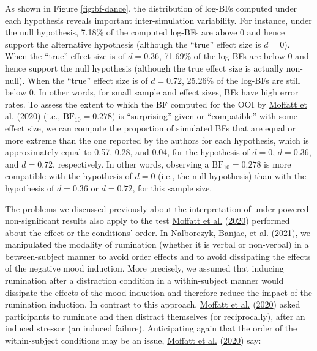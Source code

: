 \documentclass[
  english,
  man, donotrepeattitle,floatsintext]{apa6}
\begin{document}
As shown in Figure \ref{fig:bf-dance}, the distribution of log-BFs computed under each hypothesis reveals important inter-simulation variability. For instance, under the null hypothesis, 7.18\% of the computed log-BFs are above 0 and hence support the alternative hypothesis (although the ``true'' effect size is \(d = 0\)). When the ``true'' effect size is of \(d = 0.36\), 71.69\% of the log-BFs are below 0 and hence support the null hypothesis (although the true effect size is actually non-null). When the ``true'' effect size is of \(d = 0.72\), 25.26\% of the log-BFs are still below 0. In other words, for small sample and effect sizes, BFs have high error rates. To assess the extent to which the BF computed for the OOI by \protect\hyperlink{ref-moffatt_inner_2020}{Moffatt et al.} (\protect\hyperlink{ref-moffatt_inner_2020}{2020}) (i.e., \(\text{BF}_{10} = 0.278\)) is ``surprising'' given or ``compatible'' with some effect size, we can compute the proportion of simulated BFs that are equal or more extreme than the one reported by the authors for each hypothesis, which is approximately equal to 0.57, 0.28, and 0.04, for the hypothesis of \(d = 0\), \(d = 0.36\), and \(d = 0.72\), respectively. In other words, observing a \(\text{BF}_{10} = 0.278\) is more compatible with the hypothesis of \(d = 0\) (i.e., the null hypothesis) than with the hypothesis of \(d = 0.36\) or \(d = 0.72\), for this sample size.

The problems we discussed previously about the interpretation of under-powered non-significant results also apply to the test \protect\hyperlink{ref-moffatt_inner_2020}{Moffatt et al.} (\protect\hyperlink{ref-moffatt_inner_2020}{2020}) performed about the effect or the conditions' order. In \protect\hyperlink{ref-nalborczyk_dissociating_2021}{Nalborczyk, Banjac, et al.} (\protect\hyperlink{ref-nalborczyk_dissociating_2021}{2021}), we manipulated the modality of rumination (whether it is verbal or non-verbal) in a between-subject manner to avoid order effects and to avoid dissipating the effects of the negative mood induction. More precisely, we assumed that inducing rumination after a distraction condition in a within-subject manner would dissipate the effects of the mood induction and therefore reduce the impact of the rumination induction. In contrast to this approach, \protect\hyperlink{ref-moffatt_inner_2020}{Moffatt et al.} (\protect\hyperlink{ref-moffatt_inner_2020}{2020}) asked participants to ruminate and then distract themselves (or reciprocally), after an induced stressor (an induced failure). Anticipating again that the order of the within-subject conditions may be an issue, \protect\hyperlink{ref-moffatt_inner_2020}{Moffatt et al.} (\protect\hyperlink{ref-moffatt_inner_2020}{2020}) say:
\end{document}
